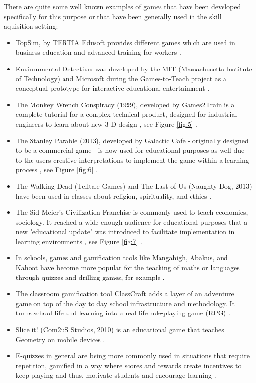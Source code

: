 There are quite some well known examples of games that have been developed specifically for this purpose or that have been generally used in the skill aquisition setting:
\begin{itemize}
\item TopSim, by TERTIA Edusoft provides different games which are used in business education and advanced training for workers \cite{aspects}.
\item Environmental Detectives was developed by the MIT (Massachusetts Institute of Technology) and Microsoft during the Games-to-Teach project as a conceptual prototype for interactive educational entertainment \cite{aspects}.
\item The Monkey Wrench Conspiracy (1999), developed by Games2Train is a complete tutorial for a complex technical product, designed for industrial engineers to learn about new 3-D design \cite{aspects}, see Figure \ref{fig:5} \cite{monkey}.
\item The Stanley Parable (2013), developed by Galactic Cafe - originally designed to be a commercial game - is now used for educational purposes as well due to the users creative interpretations to implement the game within a learning process \cite{domestic}, see Figure \ref{fig:6} \cite{stanley}.
\item The Walking Dead (Telltale Games) and The Last of Us (Naughty Dog, 2013) have been used in classes about religion, spirituality, and ethics \cite{domestic}.
\item The Sid Meier's Civilization Franchise is commonly used to teach economics, sociology. It reached a wide enough audience for educational purposes that a new "educational update" was introduced to facilitate implementation in learning environments \cite{domestic}, see Figure \ref{fig:7} \cite{civil}.
\item In schools, games and gamification tools like Mangahigh, Abakus, and Kahoot have become more popular for the teaching of maths or languages through quizzes and drilling games, for example \cite{domestic}.
\item The classroom gamification tool ClassCraft adds a layer of an adventure game on top of the day to day school infrastructure and methodology. It turns school life and learning into a real life role-playing game (RPG) \cite{gamific} \cite{compare}.
\item Slice it! (Com2uS Studios, 2010) is an educational game that teaches Geometry on mobile devices \cite{model}.
\item E-quizzes in general are being more commonly used in situations that require repetition, gamified in a way where scores and rewards create incentives to keep playing and thus, motivate students and encourage learning \cite{gamific}.
\end{itemize}


